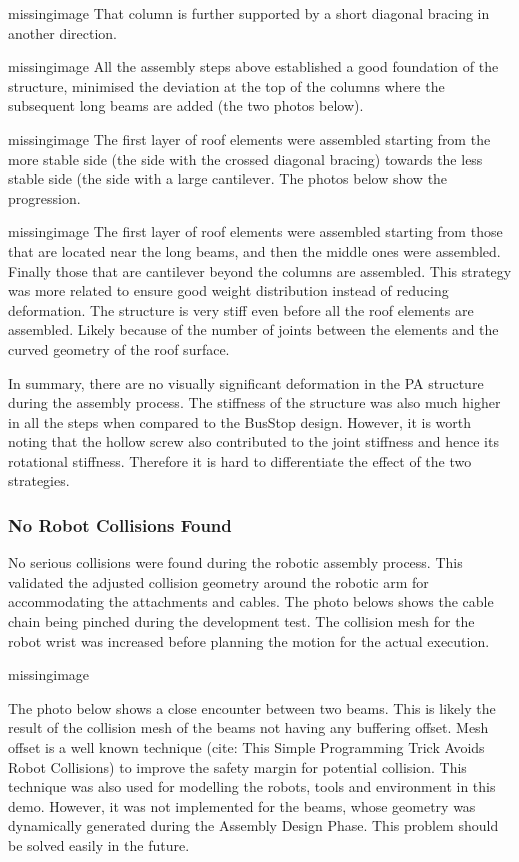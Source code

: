 missingimage
That column is further supported by a short diagonal bracing in another direction.

missingimage
All the assembly steps above established a good foundation of the structure, minimised the deviation at the top of the columns where the subsequent long beams are added (the two photos below).  

missingimage
The first layer of roof elements were assembled starting from the more stable side (the side with the crossed diagonal bracing) towards the less stable side (the side with a large cantilever. The photos below show the progression.

missingimage
The first layer of roof elements were assembled starting from those that are located near the long beams, and then the middle ones were assembled. Finally those that are cantilever beyond the columns are assembled. This strategy was more related to ensure good weight distribution instead of reducing deformation. The structure is very stiff even before all the roof elements are assembled. Likely because of the number of joints between the elements and the curved geometry of the roof surface.

In summary, there are no visually significant deformation in the PA structure during the assembly process. The stiffness of the structure was also much higher in all the steps when compared to the BusStop design. However, it is worth noting that the hollow screw also contributed to the joint stiffness and hence its rotational stiffness. Therefore it is hard to differentiate the effect of the two strategies. 

\subsubsection{No Robot Collisions Found}
No serious collisions were found during the robotic assembly process. This validated the adjusted collision geometry around the robotic arm for accommodating the attachments and cables. The photo belows shows the cable chain being pinched during the development test. The collision mesh for the robot wrist was increased before planning the motion for the actual execution.

missingimage

The photo below shows a close encounter between two beams. This is likely the result of the collision mesh of the beams not having any buffering offset. Mesh offset is a well known technique (cite: This Simple Programming Trick Avoids Robot Collisions) to improve the safety margin for potential collision. This technique was also used for modelling the robots, tools and environment in this demo. However, it was not implemented for the beams, whose geometry was dynamically generated during the Assembly Design Phase. This problem should be solved easily in the future.

